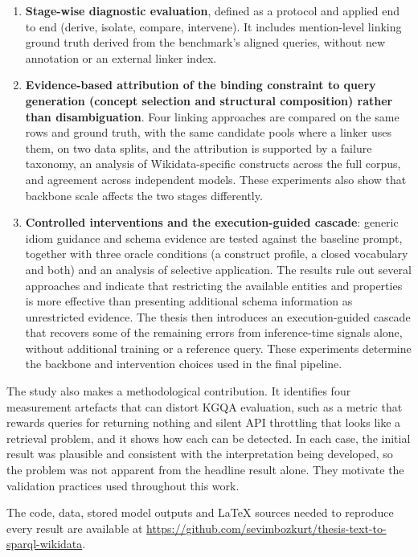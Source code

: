 \begin{enumerate}
\def\labelenumi{\arabic{enumi}.}
\item
\textbf{Stage-wise diagnostic evaluation}, defined as a protocol and applied end to end (derive, isolate, compare, intervene).
It includes mention-level linking ground truth derived from the benchmark's aligned queries, without new annotation or an external linker index.
\item
\textbf{Evidence-based attribution of the binding constraint to query generation (concept selection and structural composition) rather than disambiguation}.
Four linking approaches are compared on the same rows and ground truth, with the same candidate pools where a linker uses them, on two data splits, and the attribution is supported by a failure taxonomy, an analysis of Wikidata-specific constructs across the full corpus, and agreement across independent models.
These experiments also show that backbone scale affects the two stages differently.
\item
\textbf{Controlled interventions and the execution-guided cascade}: generic idiom guidance and schema evidence are tested against the baseline prompt, together with three oracle conditions (a construct profile, a closed vocabulary and both) and an analysis of selective application.
The results rule out several approaches and indicate that restricting the available entities and properties is more effective than presenting additional schema information as unrestricted evidence.
The thesis then introduces an execution-guided cascade that recovers some of the remaining errors from inference-time signals alone, without additional training or a reference query.
These experiments determine the backbone and intervention choices used in the final pipeline.
\end{enumerate}

The study also makes a methodological contribution.
It identifies four measurement artefacts that can distort KGQA evaluation, such as a metric that rewards queries for returning nothing and silent API throttling that looks like a retrieval problem, and it shows how each can be detected.
In each case, the initial result was plausible and consistent with the interpretation being developed, so the problem was not apparent from the headline result alone.
They motivate the validation practices used throughout this work.

The code, data, stored model outputs and LaTeX sources needed to reproduce every result are available at \url{https://github.com/sevimbozkurt/thesis-text-to-sparql-wikidata}.
